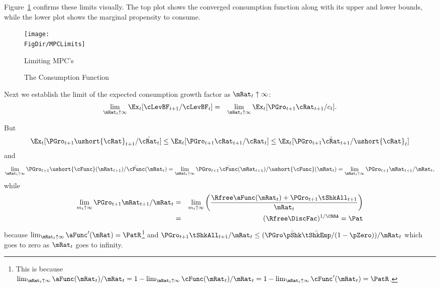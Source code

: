 \documentclass[titlepage]{\econtex}\providecommand{\texname}{BufferStockTheory}%
\providecommand{\FigDir}{Figures}
\begin{document}
{Figure~\ref{fig:mpclimits} confirms these limits visually.  The top
plot shows the converged consumption function along with its upper and lower bounds,
while the lower plot shows the marginal propensity to consume.
\renewcommand{\figFile}{MPCLimits}
\hypertarget{\figFile}{}
\begin{figure}
\texttt{[image: \\FigDir/MPCLimits]}
\caption{Limiting MPC's}
\label{fig:mpclimits}
\end{figure}

\renewcommand{\figFile}{cFuncBounds}
\hypertarget{\figFile}{}
\begin{figure}
\centering
{}
\caption{The Consumption Function}
\label{fig:cFuncBounds}
\end{figure}
%

Next we establish the limit of the expected consumption growth factor
as $\mRat_{t} \uparrow \infty$:
\begin{eqnarray}
\lim_{\mRat_{t} \uparrow \infty} \Ex_{t}[
\cLevBF_{t+1}/\cLevBF_{t}] & = & \lim_{\mRat_{t} \uparrow \infty} \Ex_{t}[
{\PGro}_{t+1} {\cRat}_{t+1}/c_{t}]. \notag
\end{eqnarray}

But
\begin{eqnarray*}
\Ex_{t}[{\PGro}_{t+1} {\ushort{\cRat}}_{t+1}/\bar{\cRat_{t}}] \leq \Ex_{t}[{\PGro}_{t+1} {\cRat}_{t+1}/\cRat_{t}] \leq \Ex_{t}[{\PGro}_{t+1} {\bar{\cRat}}_{t+1}/\ushort{\cRat}_{t}]
\end{eqnarray*}
and
\begin{equation}  \label{eq:xttoinfty}
\lim_{\mRat_t \uparrow \infty} \PGro_{t+1}\ushort{\cFunc}(\mRat_{t+1})/\bar{\cFunc}(\mRat_t) =
\lim_{\mRat_{t} \uparrow \infty} \PGro_{t+1}\bar{\cFunc}(\mRat_{t+1})/\ushort{\cFunc}(\mRat_t) =
\lim_{\mRat_{t} \uparrow \infty}\PGro_{t+1} \mRat_{t+1}/\mRat_t,  \notag
\end{equation}
while
\begin{eqnarray*}  \label{eq:xtp1toinfty}
\lim_{m_{t} \uparrow \infty} \PGro_{t+1} \mRat_{t+1}/\mRat_t & = & \lim_{m_{t} \uparrow \infty}
\left(\frac{\Rfree \aFunc(\mRat_t)+{\PGro}_{t+1}\tShkAll_{t+1}}{\mRat_t}\right)
\\ & = & (\Rfree \DiscFac)^{1/\CRRA} = \Pat
\end{eqnarray*}
because $\lim_{\mRat_{t}\uparrow \infty} \aFunc^{\prime}(\mRat)=\PatR$\footnote{This is because $\lim_{\mRat_{t}\uparrow \infty} \aFunc(\mRat_{t})/\mRat_{t}=1-\lim_{\mRat_{t}\uparrow \infty} \cFunc(\mRat_{t})/\mRat_{t}=1-\lim_{\mRat_{t}\uparrow \infty}\cFunc^{\prime}(\mRat_{t})=\PatR$.} and
$\PGro_{t+1}\tShkAll_{t+1}/\mRat_{t} \leq (\PGro \bar{\pShk} \bar{\tShkEmp}/\pNotZero )/\mRat_{t}$ which
goes to zero as $\mRat_{t}$ goes to infinity.

}
\end{document}
